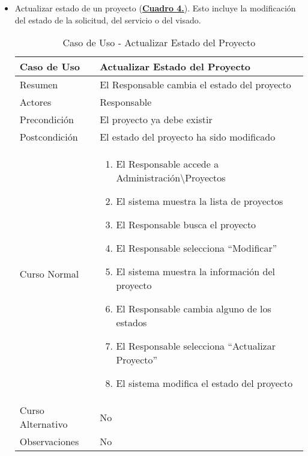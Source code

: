 \begin{itemize}
  \pagebreak
	\item \addtocounter{tabla}{1} Actualizar estado de un proyecto (\textbf{\hyperref[tab:curActualizarProyecto]{Cuadro 4.}}). Esto incluye la modificación del estado de la solicitud, del servicio o del visado.
		\begin{table}[!htbp]
		  \centering  \addtocounter{casouso}{1}
		  \begin{tabular}{|l | p{100mm}|}
		    \textbf{Caso de Uso}  & \textbf{Actualizar Estado del Proyecto} \\ \hline
		    Resumen 		 & El Responsable cambia el estado del proyecto \\ \hline
		    Actores  		 & Responsable \\ \hline
		    Precondición  	 & El proyecto ya debe existir  \\ \hline
		    Postcondición  	 & El estado del proyecto ha sido modificado \\ \hline
		    Curso Normal   	 & \begin{enumerate}
			  \item El Responsable accede a Administración\textbackslash Proyectos
			  \item El sistema muestra la lista de proyectos
			  \item El Responsable busca el proyecto
			  \item El Responsable selecciona ``Modificar''
			  \item El sistema muestra la información del proyecto
			  \item El Responsable cambia alguno de los estados
			  \item El Responsable selecciona ``Actualizar Proyecto''
			  \item El sistema modifica el estado del proyecto
		    \end{enumerate}  \\ \hline
		    Curso Alternativo  & No  \\ \hline
		    Observaciones 	 & No  \\ \hline
		  \end{tabular}
		  \caption{Caso de Uso  - Actualizar Estado del Proyecto}
		  \label{tab:curActualizarProyecto}
		\end{table}
		\FloatBarrier


\end{itemize}
